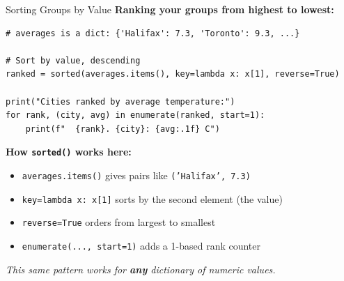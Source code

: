 \documentclass{csbeamer}
\begin{document}
\begin{frame}[fragile]{Sorting Groups by Value}
    \textbf{Ranking your groups from highest to lowest:}

    \begin{lstlisting}
# averages is a dict: {'Halifax': 7.3, 'Toronto': 9.3, ...}

# Sort by value, descending
ranked = sorted(averages.items(), key=lambda x: x[1], reverse=True)

print("Cities ranked by average temperature:")
for rank, (city, avg) in enumerate(ranked, start=1):
    print(f"  {rank}. {city}: {avg:.1f} C")
    \end{lstlisting}

    \pause

    \textbf{How \texttt{sorted()} works here:}
    \begin{itemize}
        \item<2-> \texttt{averages.items()} gives pairs like \texttt{('Halifax', 7.3)}
        \item<3-> \texttt{key=lambda x: x[1]} sorts by the \textcolor{marigold}{second element} (the value)
        \item<4-> \texttt{reverse=True} orders from \textcolor{stfxblue}{largest to smallest}
        \item<5-> \texttt{enumerate(..., start=1)} adds a \textcolor{marigold}{1-based rank counter}
    \end{itemize}

    \pause

    \begin{center}
        \textit{This same pattern works for \textbf{any} dictionary of numeric values.}
    \end{center}
\end{frame}
\end{document}
